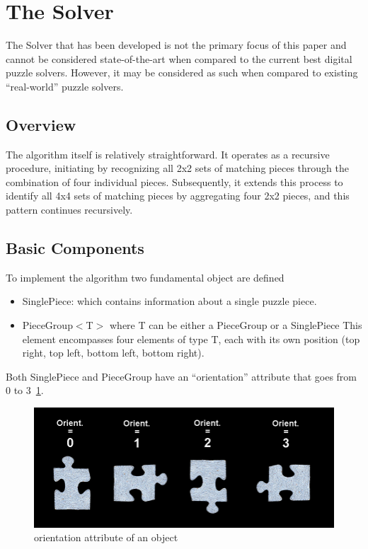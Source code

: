 \documentclass{article}
\begin{document}
\section{The Solver}\label{document:my_solver}
The Solver that has been developed is not the primary focus of this
paper and cannot be considered state-of-the-art when compared
to the current best digital puzzle solvers. However, it may be
considered as such when compared to existing ``real-world'' puzzle solvers.

\subsection{Overview}
The algorithm itself is relatively straightforward.
It operates as a recursive procedure, initiating by recognizing all 2x2
sets of matching pieces through the combination of four individual pieces.
Subsequently, it extends this process to identify all 4x4 sets of matching pieces
by aggregating four 2x2 pieces, and this pattern continues recursively.

\subsection{Basic Components}
To implement the algorithm two fundamental object are defined
\begin{itemize}
  \item SinglePiece: which contains information about a single puzzle piece.
  \item PieceGroup\(<\)T\(>\) where T can be either a PieceGroup or a SinglePiece\newline
  This element encompasses four elements of type T, each with its own position (top right, top left, bottom left, bottom right).
\end{itemize}
Both SinglePiece and PieceGroup have an ``orientation'' attribute that goes from 0 to 3~\ref{fig:orientation}.
\begin{figure}[H]
  \caption{orientation attribute of an object}\label{fig:orientation}
  \centering
  \includegraphics[height=0.3\textwidth]{pictures/orientation.png}
\end{figure}
\end{document}
